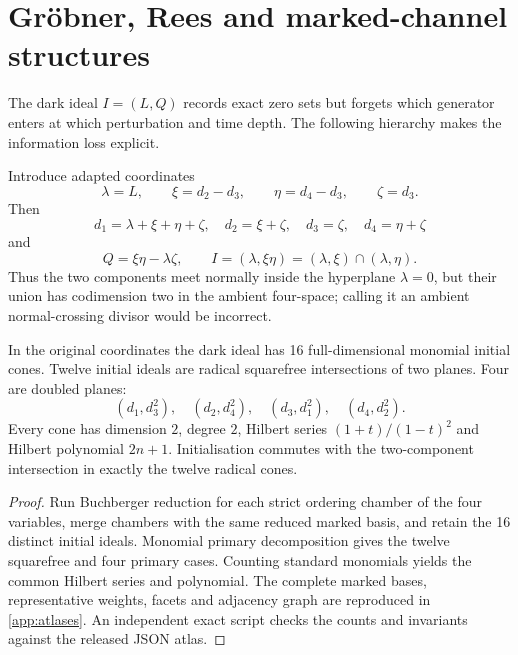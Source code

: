 \section{Gr\"obner, Rees and marked-channel structures}\label{sec:gf1}

The dark ideal \(I=(L,Q)\) records exact zero sets but forgets which generator
enters at which perturbation and time depth.  The following hierarchy makes the
information loss explicit.

Introduce adapted coordinates
\[
\lambda=L,\qquad \xi=d_2-d_3,\qquad \eta=d_4-d_3,\qquad \zeta=d_3.
\]
Then
\[
d_1=\lambda+\xi+\eta+\zeta,\quad d_2=\xi+\zeta,
\quad d_3=\zeta,\quad d_4=\eta+\zeta
\]
and
\begin{equation}\label{eq:normalcrossing}
Q=\xi\eta-\lambda\zeta,\qquad I=(\lambda,\xi\eta)
=(\lambda,\xi)\cap(\lambda,\eta).
\end{equation}
Thus the two components meet normally inside the hyperplane \(\lambda=0\), but
their union has codimension two in the ambient four-space; calling it an
ambient normal-crossing divisor would be incorrect.

\begin{theorem}\label{thm:fan}
In the original coordinates the dark ideal has 16 full-dimensional monomial
initial cones.  Twelve initial ideals are radical squarefree intersections of
two planes.  Four are doubled planes:
\[
(d_1,d_3^2),\quad(d_2,d_4^2),\quad(d_3,d_1^2),\quad(d_4,d_2^2).
\]
Every cone has dimension \(2\), degree \(2\), Hilbert series
\((1+t)/(1-t)^2\) and Hilbert polynomial \(2n+1\).  Initialisation commutes with
the two-component intersection in exactly the twelve radical cones.
\end{theorem}
\begin{proof}
Run Buchberger reduction for each strict ordering chamber of the four variables,
merge chambers with the same reduced marked basis, and retain the 16 distinct
initial ideals.  Monomial primary decomposition gives the twelve squarefree and
four primary cases.  Counting standard monomials yields the common Hilbert
series and polynomial.  The complete marked bases, representative weights,
facets and adjacency graph are reproduced in \cref{app:atlases}.  An independent
exact script checks the counts and invariants against the released JSON atlas.
\end{proof}

